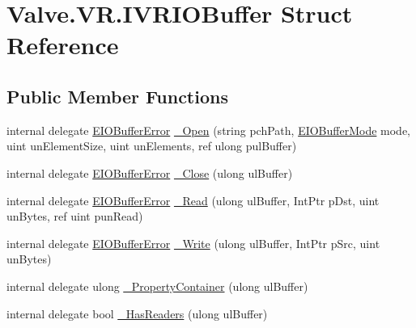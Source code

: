 \hypertarget{struct_valve_1_1_v_r_1_1_i_v_r_i_o_buffer}{}\section{Valve.\+V\+R.\+I\+V\+R\+I\+O\+Buffer Struct Reference}
\label{struct_valve_1_1_v_r_1_1_i_v_r_i_o_buffer}
\subsection*{Public Member Functions}
\begin{DoxyCompactItemize}
\item 
internal delegate \mbox{\hyperlink{namespace_valve_1_1_v_r_a11d6c73dbb80923b10779c007bb8c154}{E\+I\+O\+Buffer\+Error}} \mbox{\hyperlink{struct_valve_1_1_v_r_1_1_i_v_r_i_o_buffer_a95ed10b524750552d8ae33a0ed369da2}{\+\_\+\+Open}} (string pch\+Path, \mbox{\hyperlink{namespace_valve_1_1_v_r_a59487dd6eb3684570995a3bea405db2e}{E\+I\+O\+Buffer\+Mode}} mode, uint un\+Element\+Size, uint un\+Elements, ref ulong pul\+Buffer)
\item 
internal delegate \mbox{\hyperlink{namespace_valve_1_1_v_r_a11d6c73dbb80923b10779c007bb8c154}{E\+I\+O\+Buffer\+Error}} \mbox{\hyperlink{struct_valve_1_1_v_r_1_1_i_v_r_i_o_buffer_a3c467ee9ea9833cef96b30c7dbbd933d}{\+\_\+\+Close}} (ulong ul\+Buffer)
\item 
internal delegate \mbox{\hyperlink{namespace_valve_1_1_v_r_a11d6c73dbb80923b10779c007bb8c154}{E\+I\+O\+Buffer\+Error}} \mbox{\hyperlink{struct_valve_1_1_v_r_1_1_i_v_r_i_o_buffer_ae347b94fa06c9a91e3f7bb3baa432c6a}{\+\_\+\+Read}} (ulong ul\+Buffer, Int\+Ptr p\+Dst, uint un\+Bytes, ref uint pun\+Read)
\item 
internal delegate \mbox{\hyperlink{namespace_valve_1_1_v_r_a11d6c73dbb80923b10779c007bb8c154}{E\+I\+O\+Buffer\+Error}} \mbox{\hyperlink{struct_valve_1_1_v_r_1_1_i_v_r_i_o_buffer_a54b193825077c30de700adf41e81b975}{\+\_\+\+Write}} (ulong ul\+Buffer, Int\+Ptr p\+Src, uint un\+Bytes)
\item 
internal delegate ulong \mbox{\hyperlink{struct_valve_1_1_v_r_1_1_i_v_r_i_o_buffer_abbf839546716805d584e6cba3040013a}{\+\_\+\+Property\+Container}} (ulong ul\+Buffer)
\item 
internal delegate bool \mbox{\hyperlink{struct_valve_1_1_v_r_1_1_i_v_r_i_o_buffer_a6a33628dafbef18c06553fe1ba31e8cc}{\+\_\+\+Has\+Readers}} (ulong ul\+Buffer)
\end{DoxyCompactItemize}
